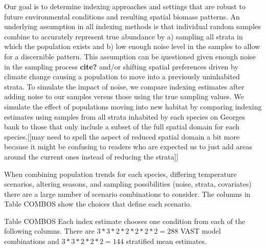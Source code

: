 \documentclass[
  12pt,
]{article}
\begin{document}
Our goal is to determine indexing approaches and settings that are robust to future environmental conditions and resulting spatial biomass patterns. An underlying assumption in all indexing methods is that individual random samples combine to accurately represent true abundance by a) sampling all strata in which the population exists and b) low enough noise level in the samples to allow for a discernible pattern. This assumption can be questioned given enough noise in the sampling process \textbf{cite?} and/or shifting spatial preferences driven by climate change causing a population to move into a previously uninhabited strata. To simulate the impact of noise, we compare indexing estimates after adding noise to our samples versus those using the true sampling values. We simulate the effect of populations moving into new habitat by comparing indexing estimates using samples from all strata inhabited by each species on Georges bank to those that only include a subset of the full spatial domain for each species.{[}{[}may need to spell the aspect of reduced spatial domain a bit more because it might be confusing to readers who are expected us to just add areas around the current ones instead of reducing the strata{]}{]}

When combining population trends for each species, differing temperature scenarios, altering seasons, and sampling possibilities (noise, strata, covariates) there are a large number of scenario combinations to consider. The columns in Table COMBOS show the choices that define each scenario.

Table COMBOS Each index estimate chooses one condition from each of the following columns. There are \(3*3*2*2*2*2*2=288\) VAST model combinations and \(3*3*2*2*2=144\) stratified mean estimates.
\end{document}

